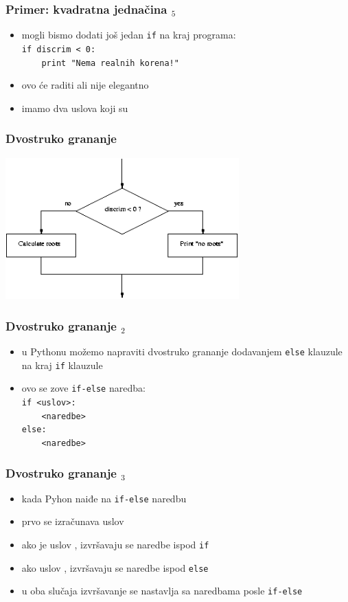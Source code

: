 \documentclass[utf8,compress]{beamer}
\begin{document}
\begin{frame}[fragile]
  \frametitle{Primer: kvadratna jednačina $_5$}
  \begin{itemize}
    \item mogli bismo dodati još jedan \texttt{if} na kraj programa: \\
        \texttt{if discrim < 0:} \\
        \texttt{\ \ \ \ print "Nema realnih korena!"}
    \item ovo će raditi ali nije elegantno
    \item imamo dva uslova koji su 
  \end{itemize}
\end{frame}

\begin{frame}[fragile]
  \frametitle{Dvostruko grananje}
  \begin{center}
    \includegraphics[width=9cm]{pic15}
  \end{center}
\end{frame}

\begin{frame}[fragile]
  \frametitle{Dvostruko grananje $_2$}
  \begin{itemize}
    \item u Pythonu možemo napraviti dvostruko grananje dodavanjem \texttt{else} klauzule na kraj \texttt{if} klauzule
    \item ovo se zove \texttt{if-else} naredba: \\
        \texttt{if <uslov>:} \\
        \texttt{\ \ \ \ <naredbe>} \\
        \texttt{else:} \\
        \texttt{\ \ \ \ <naredbe>}
  \end{itemize}
\end{frame}

\begin{frame}[fragile]
  \frametitle{Dvostruko grananje $_3$}
  \begin{itemize}
    \item kada Pyhon naiđe na \texttt{if-else} naredbu
    \item prvo se izračunava uslov
    \item ako je uslov , izvršavaju se naredbe ispod \texttt{if}
    \item ako uslov , izvršavaju se naredbe ispod \texttt{else}
    \item u oba slučaja izvršavanje se nastavlja sa naredbama posle \texttt{if-else}
  \end{itemize}
\end{frame}
\end{document}
